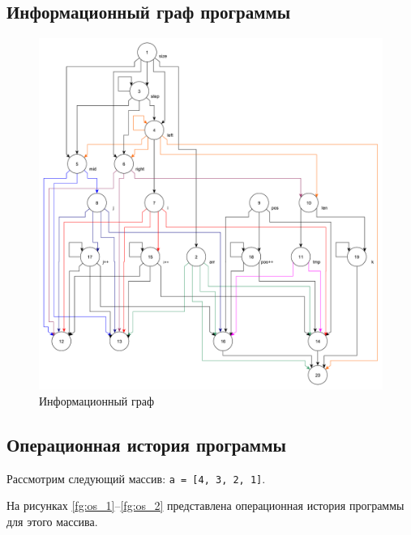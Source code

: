 \clearpage

\subsection{Информационный граф программы}

\begin{figure}[h]
	\centering
	\includegraphics[height=0.6\textheight]{img/информационный_граф.pdf}
	\caption{Информационный граф}
	\label{fg:ig}
\end{figure}

\clearpage

\subsection{Операционная история программы}

Рассмотрим следующий массив: \texttt{a = [4, 3, 2, 1]}.

На рисунках \ref{fg:os_1}--\ref{fg:os_2} представлена операционная история программы для этого массива.

